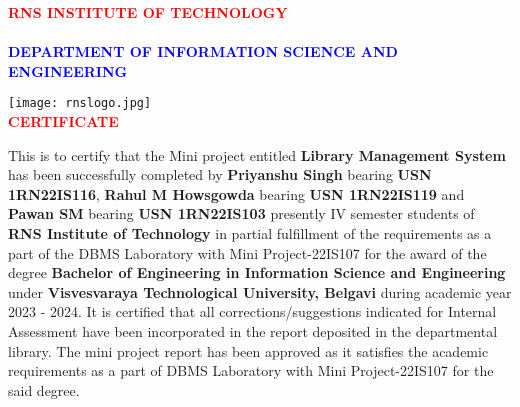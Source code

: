 \documentclass{article}
\date{}
\begin{document}
	\thisfancypage{
		\setlength{\fboxsep}{15pt}\doublebox}{}
	\begin{titlepage}
		\begin{center}
			\vspace{1cm}
			\noindent
			\centering\textcolor{red}{\textbf{\LARGE RNS INSTITUTE OF TECHNOLOGY\\}}
			\vspace{1cm}\\
			\centering
			\textcolor{blue}{\textbf{\fontsize{13}{5}\selectfont DEPARTMENT OF INFORMATION SCIENCE AND ENGINEERING}}
			
			\vspace{1cm}
			\texttt{[image: rnslogo.jpg]}\\
			\vspace{.5cm}
			\textcolor{red}{\textbf{\LARGE CERTIFICATE}}
			
			\vspace{.9cm}
			
		\end{center}
\justify
This is to certify that the Mini project entitled \textbf{Library Management System} has been successfully completed by \textbf{Priyanshu Singh} bearing \textbf{USN 1RN22IS116}, \textbf{Rahul M Howsgowda} bearing \textbf{USN 1RN22IS119} and \textbf{Pawan SM} bearing \textbf{USN 1RN22IS103} presently IV semester students of \textbf{RNS Institute of Technology} in partial fulfillment of the requirements as a part of the DBMS Laboratory with Mini Project-22IS107 for the award of the degree \textbf{Bachelor of Engineering in Information Science and Engineering} under \textbf{Visvesvaraya Technological University, Belgavi} during academic year 2023 - 2024. It is certified that all corrections/suggestions indicated for Internal Assessment have been incorporated in the report deposited in the departmental library. The mini project report has been approved as it satisfies the academic requirements as a part of DBMS Laboratory with Mini Project-22IS107 for the said degree.
		

\end{titlepage}
\end{document}
